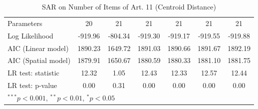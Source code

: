 \begin{table}[!h]
\begin{center}
\begin{tabular}{l c c c c c c }
Parameters              & 20           & 21           & 21           & 21           & 21           & 21           \\
Log Likelihood          & -919.96      & -804.34      & -919.30      & -919.17      & -919.55      & -919.88      \\
AIC (Linear model)      & 1890.23      & 1649.72      & 1891.03      & 1890.66      & 1891.67      & 1892.19      \\
AIC (Spatial model)     & 1879.91      & 1650.67      & 1880.59      & 1880.33      & 1881.10      & 1881.75      \\
LR test: statistic      & 12.32        & 1.05         & 12.43        & 12.33        & 12.57        & 12.44        \\
LR test: p-value        & 0.00         & 0.31         & 0.00         & 0.00         & 0.00         & 0.00         \\
\bottomrule
\multicolumn{7}{l}{\scriptsize{$^{***}p<0.001$, $^{**}p<0.01$, $^*p<0.05$}}
\end{tabular}
\caption{SAR on Number of Items of Art. 11 (Centroid Distance)}
\label{table:coefficients}
\end{center}
\end{table}
